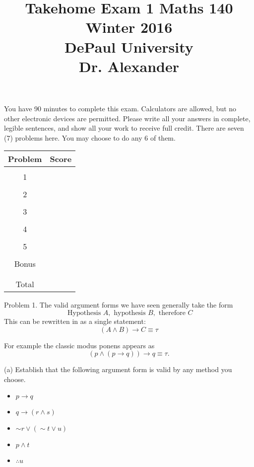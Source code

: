 \documentclass[16 pt]{amsart}
\theoremstyle{definition}
\theoremstyle{remark}
\numberwithin{equation}{subsection}
\begin{document}
\title{Takehome Exam 1 Maths 140 Winter 2016 \\ DePaul University\\Dr. Alexander}
\maketitle
You have 90 minutes to complete this exam.  Calculators are allowed, but no other electronic devices are permitted.  Please write all your answers in complete, legible sentences, and show all your work to receive full credit.  There are seven (7) problems here.  You may choose to do any 6 of them.  
\vspace{1in}


\begin{center}
  \begin{tabular}{ c | c }
    Problem & Score\\
    \hline
    &\\
    1&\\
    &\\
    2&\\
    &\\
    3&\\
    &\\
    4&\\
    &\\
    5&\\
    &\\
    Bonus&\\
    &\\
    \hline 
    &\\    
    Total& 
 \end{tabular}
\end{center}

\newpage 
Problem 1. The valid argument forms we have seen generally take the form
\[
\text{ Hypothesis } A, \text{ hypothesis } B, \text{ therefore } C
\]
This can be rewritten in as a single statement:
\[
(A\wedge B) \rightarrow C \equiv \tau
\]

For example the classic modus ponens appears as
\[
(p \wedge(p\rightarrow q)) \rightarrow q \equiv \tau.
\]

(a) Establish that the following argument form is valid by any method you choose.
\begin{itemize}
\item[] $p\rightarrow q$\\
\item[] $q \rightarrow (r \wedge s)$\\
\item[] $\sim r \vee (\sim t \vee u)$\\
\item[] $p\wedge t$\\
\item[] $\therefore u$
\end{itemize}
 
\end{document}
